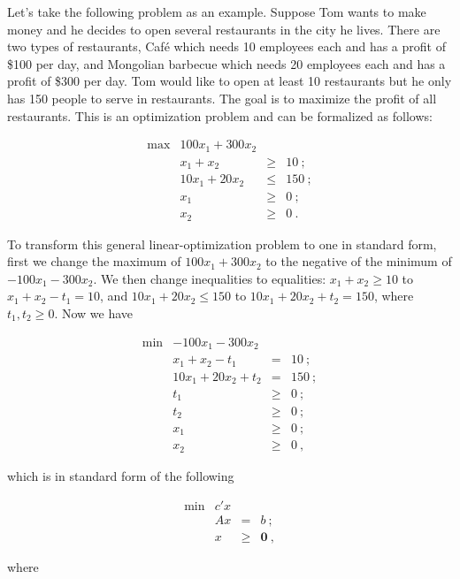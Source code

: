Let's take the following problem as an example. Suppose Tom wants to make money and he decides to open several restaurants in the city he lives. There are two types of restaurants, Caf\'{e} which needs 10 employees each and has a profit of \$100 per day, and Mongolian barbecue which needs 20 employees each and has a profit of \$300 per day. Tom would like to open at least 10 restaurants but he only has 150 people to serve in restaurants. The goal is to maximize the profit of all restaurants. This is an optimization problem and can be formalized as follows:

\[
\begin{array}{rrcl}
 \max & 100x_1 + 300x_2  &      &   \\
      &  x_1 + x_2  &   \geq  & 10~; \\
      &  10x_1 + 20x_2 & \leq & 150~; \\
      &   x_1  & \geq & 0 ~; \\
      &   x_2  & \geq & 0~.
\end{array}
\]

To transform this general linear-optimization problem to one in standard form, first we change the maximum of $100x_1 + 300x_2$ to the negative of the minimum of $-100x_1 - 300x_2$. We then change inequalities to equalities: $ x_1 + x_2 \geq 10$ to $ x_1 + x_2 - t_1 = 10$, and $10x_1 + 20x_2 \leq 150$ to $10x_1 + 20x_2 + t_2  = 150 $, where $t_1,t_2\geq 0$. Now we have

\[
\begin{array}{rrcl}
 \min & -100x_1 - 300x_2  &      &   \\
      &  x_1 + x_2 - t_1  &   =  & 10~; \\
      &  10x_1 + 20x_2 + t_2 & = & 150~; \\
      &   t_1  & \geq & 0~; \\
      &   t_2  & \geq & 0~; \\
      &   x_1  & \geq & 0 ~; \\
      &   x_2  & \geq & 0~,
\end{array}
\]

which is in standard form of the following

\[
\tag{P}
\begin{array}{rrcl}
 \min & c'x  &      &   \\
      &  Ax  &   =  & b~; \\
      &   x  & \geq & \mathbf{0}~,
\end{array}
\]

where

